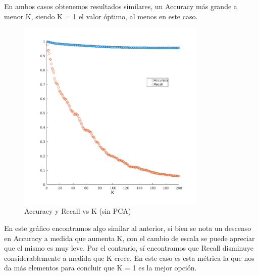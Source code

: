 En ambos casos obtenemos resultados similares, un Accuracy más grande a menor K, siendo K = 1 el valor óptimo, al menos en este caso.


\begin{figure}[H]
	\centering
	\includegraphics[width=0.8\textwidth]{img/Acc_recall_k_knn.png}
	\caption{Accuracy y Recall vs K (sin PCA)}
	\label{fig: Accuracy y Recall vs K (sin PCA)}
\end{figure}

En este gráfico encontramos algo similar al anterior, si bien se nota un descenso en Accuracy a medida que aumenta K, con el cambio de escala se puede apreciar que el mismo es muy leve.
Por el contrario, sí encontramos que Recall disminuye considerablemente a medida que K crece. En este caso es esta métrica la que nos da más elementos para concluir que K = 1 es la mejor opción.


